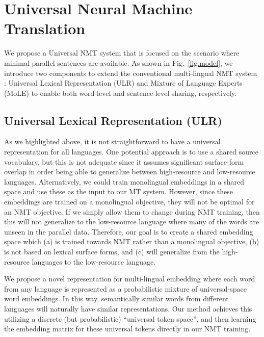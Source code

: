 \section{Universal Neural Machine Translation}
We propose a Universal NMT system that is focused on the scenario where minimal parallel sentences are available. 
As shown in Fig.~\ref{fig.model}, we introduce two components to extend the conventional multi-lingual NMT system \cite{johnson2016google}: Universal Lexical Representation (ULR) and Mixture of Language Experts (MoLE) to enable both word-level and sentence-level sharing, respectively.

\subsection{Universal Lexical Representation (ULR)}
\label{sec.unilex}

As we highlighted above, it is not straightforward to have a universal representation  for all languages. One potential approach is to use a shared source vocabulary, but this is not adequate since it assumes significant  surface-form overlap in order being able to generalize between high-resource and low-resource languages. Alternatively, we could train monolingual embeddings in a shared space and use these as the input to our MT system. However, since these embeddings are trained on a monolingual objective, they will not be optimal for an NMT objective. If we simply allow them to change during NMT training, then this will not generalize to the low-resource language where many of the words are unseen in the parallel data.
Therefore, our goal is to create a shared embedding space which (a) is trained towards NMT rather than a monolingual objective, (b) is not based on lexical surface forms, and (c) will generalize from the high-resource languages to the low-resource language. 

We propose a novel representation for multi-lingual embedding where each word from any language is represented as a probabilistic mixture of universal-space word embeddings. In this way, semantically similar words from different languages will naturally have similar representations. Our  method achieves this  utilizing a discrete (but probabilistic) ``universal token space'', and then learning the embedding matrix for these universal tokens directly in our NMT training.

